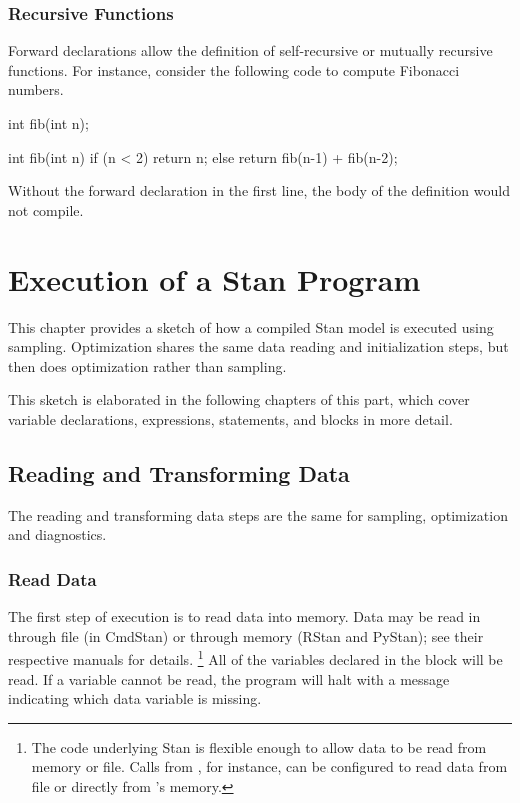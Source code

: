 \subsection{Recursive Functions}

Forward declarations allow the definition of self-recursive or
mutually recursive functions.  For instance, consider the following
code to compute Fibonacci numbers.
%
\begin{stancode}
int fib(int n);

int fib(int n) {
  if (n < 2) return n;
  else return fib(n-1) + fib(n-2);
}
\end{stancode}
%
Without the forward declaration in the first line, the body of the
definition would not compile.



\chapter{Execution of a Stan Program}

\noindent
This chapter provides a sketch of how a compiled Stan model is
executed using sampling.  Optimization shares the same data reading
and initialization steps, but then does optimization rather than sampling.

This sketch is elaborated in the following chapters of this part,
which cover variable declarations, expressions, statements, and blocks
in more detail.


\section{Reading and Transforming Data}

The reading and transforming data steps are the same for sampling,
optimization and diagnostics.

\subsection{Read Data}

The first step of execution is to read data into memory.   Data may be
read in through file (in CmdStan) or through memory (RStan and
PyStan);  see their respective manuals for details.%
%
\footnote{The \Cpp code underlying Stan is flexible enough to allow
  data to be read from memory or file.  Calls from \R, for instance,
  can be configured to read data from file or directly from \R's
  memory.}
%
All of the variables declared in the  block will be read.
If a variable cannot be read, the program will halt with a message
indicating which data variable is missing.

